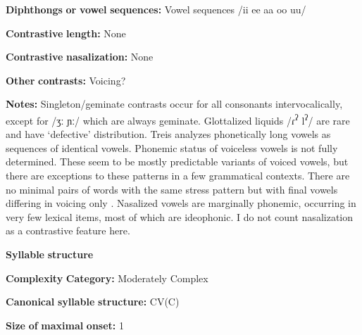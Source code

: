 \documentclass[output=paper]{langsci/langscibook}
\begin{document}
\begin{styleBody}
\textbf{Diphthongs} \textbf{or} \textbf{vowel} \textbf{sequences:} Vowel sequences /ii ee aa oo uu/
\end{styleBody}

\begin{styleBody}
\textbf{Contrastive} \textbf{length:} None
\end{styleBody}

\begin{styleBody}
\textbf{Contrastive} \textbf{nasalization:} None
\end{styleBody}

\begin{styleBody}
\textbf{Other} \textbf{contrasts:} Voicing?
\end{styleBody}

\begin{styleBody}
\textbf{Notes:} Singleton/geminate contrasts occur for all consonants intervocalically, except for /ʒː ɲː/ which are always geminate. Glottalized liquids /ɾ\textsuperscript{ʔ} l\textsuperscript{ʔ}/ are rare and have ‘defective’ distribution. Treis analyzes phonetically long vowels as sequences of identical vowels. Phonemic status of voiceless vowels is not fully determined. These seem to be mostly predictable variants of voiced vowels, but there are exceptions to these patterns in a few grammatical contexts. There are no minimal pairs of words with the same stress pattern but with final vowels differing in voicing only \citep[20-22]{Treis2008}. Nasalized vowels are marginally phonemic, occurring in very few lexical items, most of which are ideophonic. I do not count nasalization as a contrastive feature here.
\end{styleBody}

\begin{styleBody}
\textbf{Syllable} \textbf{structure}
\end{styleBody}

\begin{styleBody}
\textbf{Complexity} \textbf{Category:} Moderately Complex
\end{styleBody}

\begin{styleBody}
\textbf{Canonical} \textbf{syllable} \textbf{structure:} CV(C) \citep[41]{Treis2008}
\end{styleBody}

\begin{styleBody}
\textbf{Size} \textbf{of} \textbf{maximal} \textbf{onset:} 1
\end{styleBody}
\end{document}

